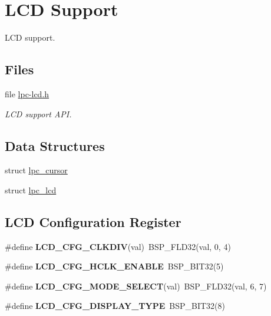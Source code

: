 \hypertarget{group__lpc__lcd}{}\section{L\+CD Support}
\label{group__lpc__lcd}


L\+CD support.  


\subsection*{Files}
\begin{DoxyCompactItemize}
\item 
file \mbox{\hyperlink{lpc-lcd_8h}{lpc-\/lcd.\+h}}
\begin{DoxyCompactList}\small\item\em L\+CD support A\+PI. \end{DoxyCompactList}\end{DoxyCompactItemize}
\subsection*{Data Structures}
\begin{DoxyCompactItemize}
\item 
struct \mbox{\hyperlink{structlpc__cursor}{lpc\+\_\+cursor}}
\item 
struct \mbox{\hyperlink{structlpc__lcd}{lpc\+\_\+lcd}}
\end{DoxyCompactItemize}
\subsection*{L\+CD Configuration Register}
\begin{DoxyCompactItemize}
\item 
\mbox{\label{group__lpc__lcd_ga7ab4ba349c305577ef0a928a0f8b02ff}} 
\#define {\bfseries L\+C\+D\+\_\+\+C\+F\+G\+\_\+\+C\+L\+K\+D\+IV}(val)~B\+S\+P\+\_\+\+F\+L\+D32(val, 0, 4)
\item 
\mbox{\label{group__lpc__lcd_ga5889ea2003eaa346f09e6d5fd6d39be6}} 
\#define {\bfseries L\+C\+D\+\_\+\+C\+F\+G\+\_\+\+H\+C\+L\+K\+\_\+\+E\+N\+A\+B\+LE}~B\+S\+P\+\_\+\+B\+I\+T32(5)
\item 
\mbox{\label{group__lpc__lcd_gaf73492612b353271b8496572c57a29b6}} 
\#define {\bfseries L\+C\+D\+\_\+\+C\+F\+G\+\_\+\+M\+O\+D\+E\+\_\+\+S\+E\+L\+E\+CT}(val)~B\+S\+P\+\_\+\+F\+L\+D32(val, 6, 7)
\item 
\mbox{\label{group__lpc__lcd_gacd6d9814d5f7a0602e40c0ea6343e46b}} 
\#define {\bfseries L\+C\+D\+\_\+\+C\+F\+G\+\_\+\+D\+I\+S\+P\+L\+A\+Y\+\_\+\+T\+Y\+PE}~B\+S\+P\+\_\+\+B\+I\+T32(8)
\end{DoxyCompactItemize}
